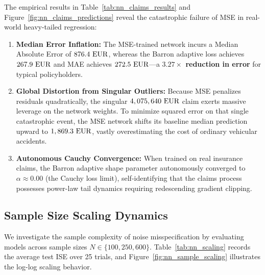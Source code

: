 The empirical results in Table~\ref{tab:nn_claims_results} and Figure~\ref{fig:nn_claims_predictions} reveal the catastrophic failure of MSE in real-world heavy-tailed regression:
\begin{enumerate}
  \item \textbf{Median Error Inflation:} The MSE-trained network incurs a Median Absolute Error of $876.4\text{ \text{EUR}}$, whereas the Barron adaptive loss achieves $267.9\text{ \text{EUR}}$ and MAE achieves $272.5\text{ \text{EUR}}$---a \textbf{$3.27\times$ reduction in error} for typical policyholders.
  \item \textbf{Global Distortion from Singular Outliers:} Because MSE penalizes residuals quadratically, the singular $4,075,640\text{ \text{EUR}}$ claim exerts massive leverage on the network weights. To minimize squared error on that single catastrophic event, the MSE network shifts its baseline median prediction upward to $1,869.3\text{ \text{EUR}}$, vastly overestimating the cost of ordinary vehicular accidents.
  \item \textbf{Autonomous Cauchy Convergence:} When trained on real insurance claims, the Barron adaptive shape parameter autonomously converged to $\alpha \approx 0.00$ (the Cauchy loss limit), self-identifying that the claims process possesses power-law tail dynamics requiring redescending gradient clipping.
\end{enumerate}

\subsection{Sample Size Scaling Dynamics}
\label{sec:nn_scaling}

We investigate the sample complexity of noise misspecification by evaluating models across sample sizes $N \in \{100, 250, 600\}$. Table~\ref{tab:nn_scaling} records the average test ISE over 25 trials, and Figure~\ref{fig:nn_sample_scaling} illustrates the log-log scaling behavior.

